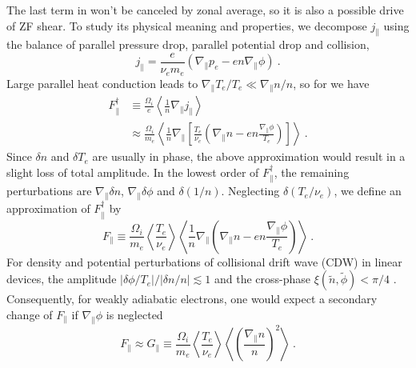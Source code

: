 \documentclass[aps,pre,twocolumn,superscriptaddress]{revtex4-1}
\begin{document}
The last term in  won't be canceled by zonal average, so it is also a possible drive of ZF shear. To study its physical meaning and properties, we decompose $j_{\parallel}$ using the balance of parallel pressure drop, parallel potential drop and collision, 
\begin{equation}
j_{\parallel}=\frac{e}{\nu_{e}m_{e}}\left(\nabla_{\parallel}p_{e}-en\nabla_{\parallel}\phi\right)~.
\label{eq:Ohm}
\end{equation}
Large parallel heat conduction leads to $\nabla_{\parallel}T_{e}/T_{e}\ll\nabla_{\parallel}n/n$, so for  we have
\begin{equation}
\begin{aligned}
	F_{\parallel}^{\dagger}
	&\equiv\frac{\Omega_{i}}{e}\left<\frac{1}{n}
	\nabla_{\parallel}j_{\parallel}\right> \\
	&\approx\frac{\Omega_{i}}{m_{e}}\left<\frac{1}{n}\nabla_{\parallel}
	\left[\frac{T_{e}}{\nu_{e}}\left(\nabla_{\parallel}n-en\frac{\nabla_{\parallel}
	\phi}{T_{e}}\right)\right]\right>~.
\label{eq:Fpar_dagger}
\end{aligned}
\end{equation}
Since $\delta n$ and $\delta T_{e}$ are usually in phase, the above approximation would result in a slight loss of total amplitude. In the lowest order of $F_{\parallel}^{\dagger}$, the remaining perturbations are $\nabla_{\parallel}\delta n$, $\nabla_{\parallel}\delta\phi$ and $\delta\left(1/n\right)$. Neglecting $\delta\left(T_{e}/\nu_{e}\right)$, we define an approximation of $F_{\parallel}^{\dagger}$ by
\begin{equation}
	F_{\parallel}\equiv\frac{\Omega_{i}}{m_{e}}\left<\frac{T_{e}}{\nu_{e}}\right>
	\left<\frac{1}{n}\nabla_{\parallel}
	\left(\nabla_{\parallel}n-en\frac{\nabla_{\parallel}
	\phi}{T_{e}}\right)\right>~.
\label{eq:Fpar}
\end{equation}
For density and potential perturbations of collisional drift wave (CDW) in linear devices, the amplitude $\left|\delta\phi/T_{e}\right|/\left|\delta n/n\right|\apprle 1$ and the cross-phase $\xi\left(\tilde{n},\tilde{\phi}\right)<\pi/4$ \cite{Thakur_2014,doi:10.1063/1.1694135}. Consequently, for weakly adiabatic electrons, one would expect a secondary change of $F_{\parallel}$ if $\nabla_{\parallel}\phi$ is neglected
\begin{equation}
	F_{\parallel}\approx G_{\parallel}
	\equiv \frac{\Omega_{i}}{m_{e}}\left<\frac{T_{e}}{\nu_{e}}\right>
	\left<\left(\frac{\nabla_{\parallel}n}{n}\right)^{2}\right>~.
\label{eq:Gpar}
\end{equation}
\end{document}
